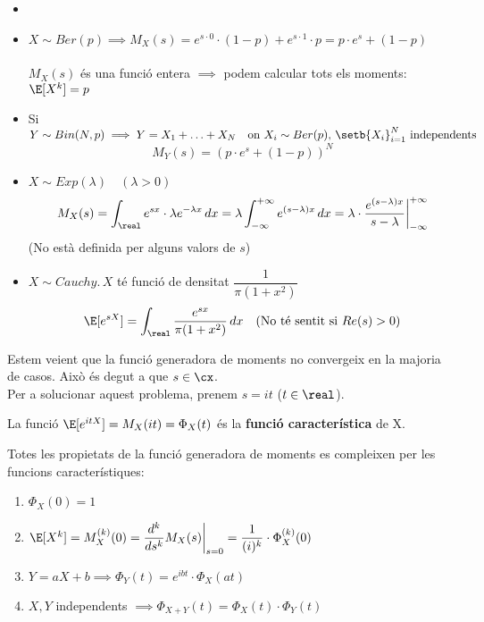\begin{example}
  \begin{itemize}
  \item[]
      \item $X \sim Ber(p) \implies M_{X}(s) = e^{s\cdot0}\cdot(1-p) + e^{s\cdot1}\cdot p = p\cdot e^{s} + (1-p)$ \\\\
      $M_{X}(s)$ és una funció entera $\implies$ podem calcular tots els moments: $\E[X^{k}] = p$ \\
      \item Si $Y \sim Bin(N,p) \implies Y=X_{1}+\ldots+X_{N} \quad \text{on } X_{i}\sim Ber(p), \, \setb{X_{i}}_{i=1}^{N} \text{ independents}$
      \[
        M_{Y}(s) = (p\cdot e^{s} + (1-p))^{N}
      \]
      \item $X\sim Exp(\lambda) \quad (\lambda > 0)$
      \[
        M_{X}(s) = \int_{\real}e^{sx}\cdot\lambda e^{-\lambda x} \, dx = \lambda\int_{-\infty}^{+\infty} e^{(s-\lambda)x} \, dx = \lambda\cdot\frac{e^{(s-\lambda)x}}{s-\lambda}\bigg|_{-\infty}^{+\infty}
      \]
      (No està definida per alguns valors de $s$)
      \item $X \sim Cauchy. \, X$ té funció de densitat $\dfrac{1}{\pi(1+x^{2})}$
      \[
        \E[e^{sX}] = \int_{\real}\frac{e^{sx}}{\pi(1+x^{2})}\, dx \quad \text{(No té sentit si $Re(s)>0$)}
      \]
  \end{itemize}
  
\end{example}

\newpage
  
Estem veient que la funció generadora de moments no convergeix en la majoria de casos. Això és degut a que $s\in\cx$. \\
Per a solucionar aquest problema, prenem $s=it$ ($t\in\real$).

\begin{defi}
  La funció $\E[e^{itX}] = M_{X}(it) = \Phi_{X}(t)$ és la \textbf{funció característica} de X.
\end{defi}

\begin{obs}
  Totes les propietats de la funció generadora de moments es compleixen per les funcions característiques:
  \begin{enumerate}
      \item  $\Phi_{X}(0) = 1$
      \item $\E[X^{k}] = M_{X}^{(k)}(0) = \dfrac{d^{k}}{ds^{k}}M_{X}(s)\bigg|_{s=0} = \dfrac{1}{(i)^{k}}\cdot \Phi_{X}^{(k)}(0)$
      \item $Y = aX+b \implies \Phi_{Y}(t) = e^{ibt}\cdot \Phi_{X}(at)$
      \item $X,Y$ independents $\implies \Phi_{X+Y}(t)=\Phi_{X}(t)\cdot\Phi_{Y}(t)$
  \end{enumerate}
\end{obs}

